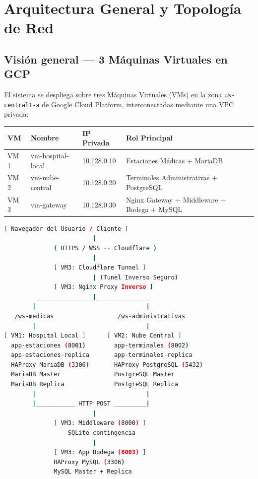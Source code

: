 \documentclass[11pt,a4paper]{article}
\begin{document}
\section{Arquitectura General y Topología de Red}

\subsection{Visión general — 3 Máquinas Virtuales en GCP}

El sistema se despliega sobre tres Máquinas Virtuales (VMs) en la zona
\texttt{us-central1-a} de Google Cloud Platform, interconectadas mediante una VPC privada:

\begin{center}
\begin{tabular}{llll}
\toprule
\textbf{VM} & \textbf{Nombre} & \textbf{IP Privada} & \textbf{Rol Principal} \\
\midrule
VM 1 & vm-hospital-local   & 10.128.0.10 & Estaciones Médicas + MariaDB \\
VM 2 & vm-nube-central     & 10.128.0.20 & Terminales Administrativas + PostgreSQL \\
VM 3 & vm-gateway          & 10.128.0.30 & Nginx Gateway + Middleware + Bodega + MySQL \\
\bottomrule
\end{tabular}
\end{center}

\begin{lstlisting}[language=bash, caption=Topología lógica del sistema distribuido]
         [ Navegador del Usuario / Cliente ]
                         |
              ( HTTPS / WSS -- Cloudflare )
                         |
              [ VM3: Cloudflare Tunnel ]
                         | (Tunel Inverso Seguro)
              [ VM3: Nginx Proxy Inverso ]
         ________________|_______________
        |                               |
   /ws-medicas                  /ws-administrativas
        |                               |
[ VM1: Hospital Local ]      [ VM2: Nube Central ]
  app-estaciones (8001)        app-terminales (8002)
  app-estaciones-replica       app-terminales-replica
  HAProxy MariaDB (3306)       HAProxy PostgreSQL (5432)
  MariaDB Master               PostgreSQL Master
  MariaDB Replica              PostgreSQL Replica
        |                               |
        |___________ HTTP POST _________|
                         |
              [ VM3: Middleware (8000) ]
                  SQLite contingencia
                         |
              [ VM3: App Bodega (8003) ]
              HAProxy MySQL (3306)
              MySQL Master + Replica
\end{lstlisting}
\end{document}
